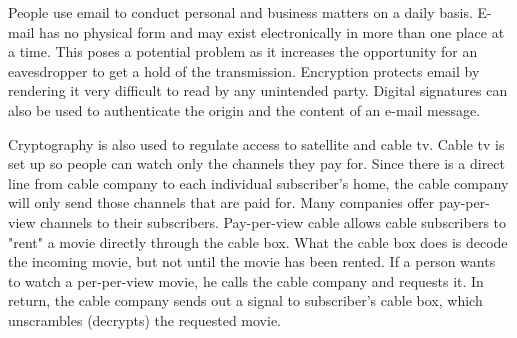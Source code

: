 \documentclass[12pt,journal,compsoc]{IEEEtran}
\begin{document}
People use email to conduct personal and business matters on a daily basis. E-mail has no physical form and may exist electronically in more than one place at a time. This poses a potential problem as it increases the opportunity for an eavesdropper to get a hold of the transmission. Encryption protects email by rendering it very difficult to read by any unintended party. Digital signatures can also be used to authenticate the origin and the content of an e-mail message.

Cryptography is also used to regulate access to satellite and cable tv. Cable tv is set up so people can watch only the channels they pay for. Since there is a direct line from cable company to each individual subscriber's home, the cable company will only send those channels that are paid for. Many companies offer pay-per-view channels to their subscribers. Pay-per-view cable allows cable subscribers to "rent" a movie directly through the cable box. What the cable box does is decode the incoming movie, but not until the movie has been rented. If a person wants to watch a per-per-view movie, he calls the cable company and requests it. In return, the cable company sends out a signal to subscriber's cable box, which unscrambles (decrypts) the requested movie.

 


%
%

\end{document}
